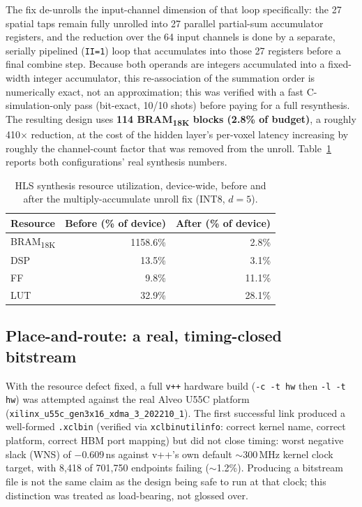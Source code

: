 \documentclass[pdflatex,sn-basic]{sn-jnl}
\begin{document}
The fix de-unrolls the input-channel dimension of that loop specifically: the 27 spatial taps remain fully unrolled into 27 parallel partial-sum accumulator registers, and the reduction over the 64 input channels is done by a separate, serially pipelined (\texttt{II=1}) loop that accumulates into those 27 registers before a final combine step. Because both operands are integers accumulated into a fixed-width integer accumulator, this re-association of the summation order is numerically exact, not an approximation; this was verified with a fast C-simulation-only pass (bit-exact, 10/10 shots) before paying for a full resynthesis. The resulting design uses \textbf{114 BRAM\textsubscript{18K} blocks (2.8\% of budget)}, a roughly 410\(\times\) reduction, at the cost of the hidden layer's per-voxel latency increasing by roughly the channel-count factor that was removed from the unroll. Table~\ref{tab:hls-before-after} reports both configurations' real synthesis numbers.

\begin{table}[t]
\centering
\caption{HLS synthesis resource utilization, device-wide, before and after the multiply-accumulate unroll fix (INT8, \(d=5\)).}\label{tab:hls-before-after}
\begin{tabular}{lrr}
\toprule
Resource & Before (\% of device) & After (\% of device) \\
\midrule
BRAM\textsubscript{18K} & 1158.6\% & 2.8\% \\
DSP & 13.5\% & 3.1\% \\
FF & 9.8\% & 11.1\% \\
LUT & 32.9\% & 28.1\% \\
\bottomrule
\end{tabular}
\end{table}

\subsection{Place-and-route: a real, timing-closed bitstream}\label{subsec:results-hw}

With the resource defect fixed, a full \texttt{v++} hardware build (\texttt{-c -t hw} then \texttt{-l -t hw}) was attempted against the real Alveo U55C platform (\texttt{xilinx\_u55c\_gen3x16\_xdma\_3\_202210\_1}). The first successful link produced a well-formed \texttt{.xclbin} (verified via \texttt{xclbinutilinfo}: correct kernel name, correct platform, correct HBM port mapping) but did not close timing: worst negative slack (WNS) of \(-0.609\)\,ns against v++'s own default \(\sim\)300\,MHz kernel clock target, with 8{,}418 of 701{,}750 endpoints failing (\(\sim\)1.2\%). Producing a bitstream file is not the same claim as the design being safe to run at that clock; this distinction was treated as load-bearing, not glossed over.
\end{document}
